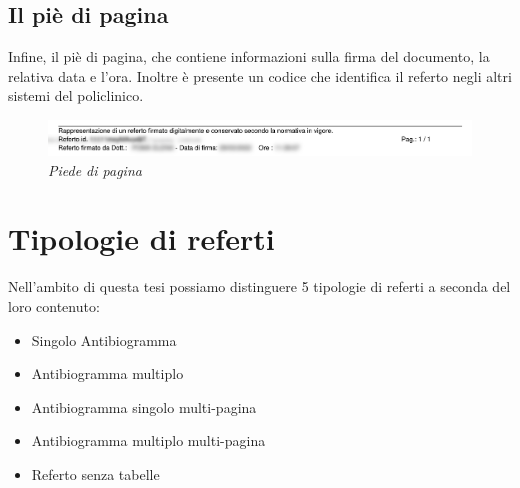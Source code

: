 \subsection{Il piè di pagina}
Infine, il piè di pagina, che contiene informazioni sulla firma del documento, la relativa data e l'ora. Inoltre è presente un codice  che identifica il referto negli altri sistemi del policlinico.

\begin{figure}[h!]
	\centering
	\includegraphics[width=.99\columnwidth]{images/footer.png}
	\caption{\textit{Piede di pagina}}
	\label{fig:content}
\end{figure}
\bigskip
\newpage

\section{Tipologie di referti}
Nell'ambito di questa tesi possiamo distinguere 5 tipologie di referti a seconda del loro contenuto:
\begin{itemize}
	\item Singolo Antibiogramma
	\item Antibiogramma multiplo
	\item Antibiogramma singolo multi-pagina
	\item Antibiogramma multiplo multi-pagina
	\item Referto senza tabelle
\end{itemize}
